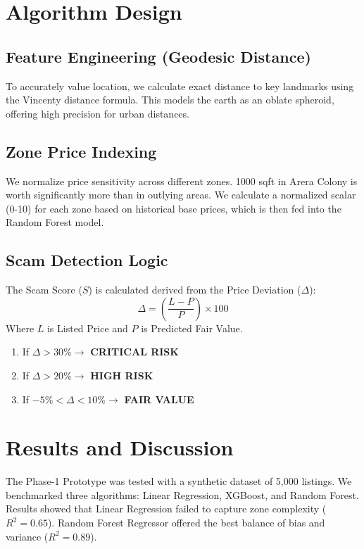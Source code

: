 \documentclass[12pt,a4paper]{report}
\begin{document}
\section{Algorithm Design}

\subsection{Feature Engineering (Geodesic Distance)}
To accurately value location, we calculate exact distance to key landmarks using the Vincenty distance formula. This models the earth as an oblate spheroid, offering high precision for urban distances.

\subsection{Zone Price Indexing}
We normalize price sensitivity across different zones. 1000 sqft in Arera Colony is worth significantly more than in outlying areas. We calculate a normalized scalar (0-10) for each zone based on historical base prices, which is then fed into the Random Forest model.

\subsection{Scam Detection Logic}
The Scam Score ($S$) is calculated derived from the Price Deviation ($\Delta$):
$$ \Delta = \left( \frac{L - P}{P} \right) \times 100 $$
Where $L$ is Listed Price and $P$ is Predicted Fair Value.
\begin{enumerate}
    \item If $\Delta > 30\% \rightarrow$ \textbf{CRITICAL RISK}
    \item If $\Delta > 20\% \rightarrow$ \textbf{HIGH RISK}
    \item If $-5\% < \Delta < 10\% \rightarrow$ \textbf{FAIR VALUE}
\end{enumerate}

\section{Results and Discussion}
The Phase-1 Prototype was tested with a synthetic dataset of 5,000 listings. We benchmarked three algorithms: Linear Regression, XGBoost, and Random Forest.
Results showed that Linear Regression failed to capture zone complexity ($R^2 = 0.65$). Random Forest Regressor offered the best balance of bias and variance ($R^2 = 0.89$).
\end{document}
